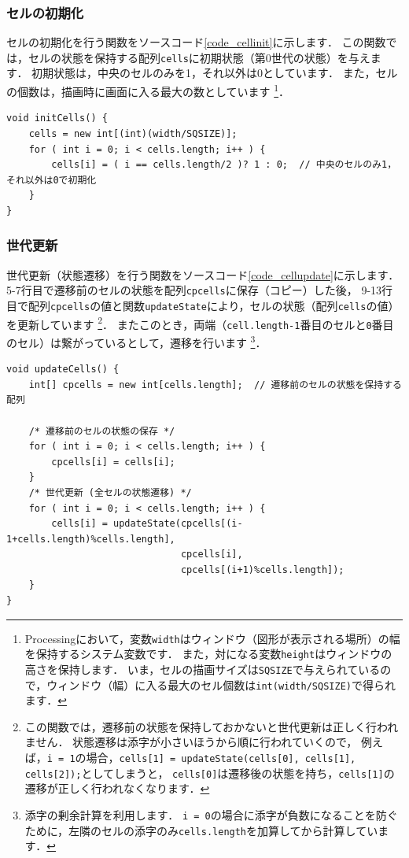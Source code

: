 \documentclass[dvipdfmx]{jsarticle}
\theoremstyle{definition}
\begin{document}
\subsubsection{セルの初期化}  \label{subsubsec_cell_init}
セルの初期化を行う関数をソースコード\ref{code_cellinit}に示します．
この関数では，セルの状態を保持する配列\verb|cells|に初期状態（第0世代の状態）を与えます．
初期状態は，中央のセルのみを1，それ以外は0としています．
また，セルの個数は，描画時に画面に入る最大の数としています
\footnote{
    \label{fnote_display_window}
    Processingにおいて，変数\texttt{width}はウィンドウ（図形が表示される場所）の幅を保持するシステム変数です．
    また，対になる変数\texttt{height}はウィンドウの高さを保持します．
    いま，セルの描画サイズは\texttt{SQSIZE}で与えられているので，ウィンドウ（幅）に入る最大のセル個数は\texttt{int(width/SQSIZE)}で得られます．
}．
%
\begin{lstlisting}[caption=セルの初期化関数, label=code_cellinit]
void initCells() {
    cells = new int[(int)(width/SQSIZE)];
    for ( int i = 0; i < cells.length; i++ ) {
        cells[i] = ( i == cells.length/2 )? 1 : 0;  // 中央のセルのみ1，それ以外は0で初期化
    }
}
\end{lstlisting}

\subsubsection{世代更新}  \label{subsubsec_gen_update}
世代更新（状態遷移）を行う関数をソースコード\ref{code_cellupdate}に示します．
5-7行目で遷移前のセルの状態を配列\verb|cpcells|に保存（コピー）した後，
9-13行目で配列\verb|cpcells|の値と関数\verb|updateState|により，セルの状態（配列\verb|cells|の値）を更新しています
\footnote{
    この関数では，遷移前の状態を保持しておかないと世代更新は正しく行われません．
    状態遷移は添字が小さいほうから順に行われていくので，
    例えば，\texttt{i = 1}の場合，\texttt{cells[1] = updateState(cells[0], cells[1], cells[2]);}としてしまうと，
    \texttt{cells[0]}は遷移後の状態を持ち，\texttt{cells[1]}の遷移が正しく行われなくなります．
}．
またこのとき，両端（\verb|cell.length-1|番目のセルと\verb|0|番目のセル）は繋がっているとして，遷移を行います
\footnote{
    添字の剰余計算を利用します．
    \texttt{i = 0}の場合に添字が負数になることを防ぐために，左隣のセルの添字のみ\texttt{cells.length}を加算してから計算しています．
}．
%
\begin{lstlisting}[caption=世代更新関数, label=code_cellupdate]
void updateCells() {
    int[] cpcells = new int[cells.length];  // 遷移前のセルの状態を保持する配列

    /* 遷移前のセルの状態の保存 */
    for ( int i = 0; i < cells.length; i++ ) {
        cpcells[i] = cells[i];
    }
    /* 世代更新 (全セルの状態遷移) */
    for ( int i = 0; i < cells.length; i++ ) {
        cells[i] = updateState(cpcells[(i-1+cells.length)%cells.length],
                               cpcells[i],
                               cpcells[(i+1)%cells.length]);
    }
}
\end{lstlisting}
\end{document}
